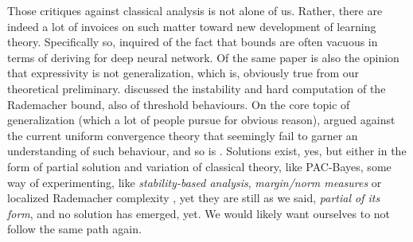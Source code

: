 \documentclass[10pt]{article} %
\begin{document}
Those critiques against classical analysis is not alone of us. Rather, there are indeed a lot of invoices on such matter toward new development of learning theory. Specifically so, \cite{zhang2017understandingdeeplearningrequires} inquired of the fact that bounds are often vacuous in terms of deriving for deep neural network. Of the same paper is also the opinion that expressivity is not generalization, which is, obviously true from our theoretical preliminary. \cite{truong2025rademachercomplexitybasedgeneralizationbounds} discussed the instability and hard computation of the Rademacher bound, also of threshold behaviours. On the core topic of generalization (which a lot of people pursue for obvious reason), \cite{nagarajan2021uniformconvergenceunableexplain} argued against the current uniform convergence theory that seemingly fail to garner an understanding of such behaviour, and so is \cite{tunali2019empirical}. Solutions exist, yes, but either in the form of partial solution and variation of classical theory, like PAC-Bayes, some way of experimenting, like \textit{stability-based analysis}, \textit{margin/norm measures} or localized Rademacher complexity \cite{bartlett2005local,bartlett2017spectrally,bousquet2002stability,neyshabur2015norm}, yet they are still as we said, \textit{partial of its form}, and no solution has emerged, yet. We would likely want ourselves to not follow the same path again. 
\end{document}
